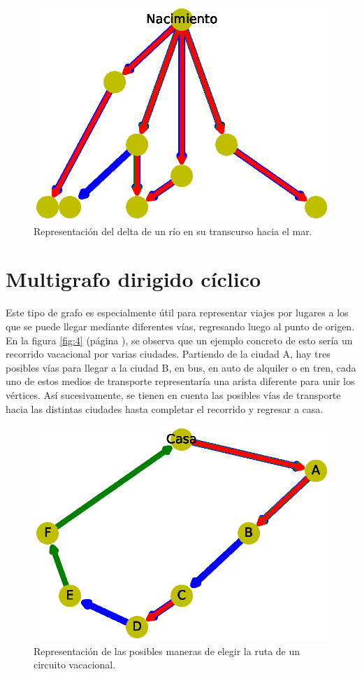 \documentclass{article}
\begin{document}

\begin{figure}
  \includegraphics[width=.8\columnwidth]{10.eps}
  \vspace*{-8mm}
  \caption{Representación del delta de un río en su transcurso hacia el mar.}
  \label{fig:10}
\end{figure}

\section{Multigrafo dirigido cíclico}

Este tipo de grafo es especialmente útil para representar viajes por lugares a los que se puede llegar mediante diferentes vías, regresando luego al punto de origen. En la figura \ref{fig:4} (página \pageref{fig:4}), se observa que un ejemplo concreto de esto sería un recorrido vacacional por varias ciudades. Partiendo de la ciudad A, hay tres posibles vías  para llegar a la ciudad B, en bus, en auto de alquiler o en tren, cada uno de estos medios de transporte representaría una arista diferente para unir los vértices. Así sucesivamente, se tienen en cuenta las posibles vías de transporte hacia las distintas ciudades hasta completar el recorrido y regresar a casa. 



\begin{figure}
  \includegraphics[width=.8\columnwidth]{11.eps}
  \vspace*{-8mm}
  \caption{Representación de las posibles maneras de elegir la ruta de un circuito vacacional.}
  \label{fig:11}
\end{figure}
\end{document}

